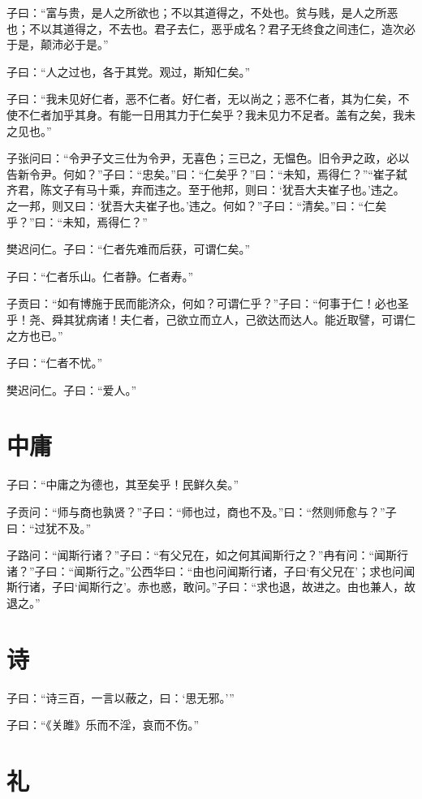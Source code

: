 \documentclass[a5paper]{ctexbook}
\begin{document}
    子曰：“富与贵，是人之所欲也；不以其道得之，不处也。贫与贱，是人之所恶也；不以其道得之，不去也。君子去仁，恶乎成名？君子无终食之间违仁，造次必于是，颠沛必于是。”

    子曰：“人之过也，各于其党。观过，斯知仁矣。”

    子曰：“我未见好仁者，恶不仁者。好仁者，无以尚之；恶不仁者，其为仁矣，不使不仁者加乎其身。有能一日用其力于仁矣乎？我未见力不足者。盖有之矣，我未之见也。”

    子张问曰：“令尹子文三仕为令尹，无喜色；三已之，无愠色。旧令尹之政，必以告新令尹。何如？”子曰：“忠矣。”曰：“仁矣乎？”曰：“未知，焉得仁？”“崔子弑齐君，陈文子有马十乘，弃而违之。至于他邦，则曰：‘犹吾大夫崔子也。’违之。之一邦，则又曰：‘犹吾大夫崔子也。’违之。何如？”子曰：“清矣。”曰：“仁矣乎？”曰：“未知，焉得仁？”

    樊迟问仁。子曰：“仁者先难而后获，可谓仁矣。”

    子曰：“仁者乐山。仁者静。仁者寿。”

    子贡曰：“如有博施于民而能济众，何如？可谓仁乎？”子曰：“何事于仁！必也圣乎！尧、舜其犹病诸！夫仁者，己欲立而立人，己欲达而达人。能近取譬，可谓仁之方也已。”

    子曰：“仁者不忧。”

    樊迟问仁。子曰：“爱人。”

    \chapter{中庸}

    子曰：“中庸之为德也，其至矣乎！民鲜久矣。”

    子贡问：“师与商也孰贤？”子曰：“师也过，商也不及。”曰：“然则师愈与？”子曰：“过犹不及。”

    子路问：“闻斯行诸？”子曰：“有父兄在，如之何其闻斯行之？”冉有问：“闻斯行诸？”子曰：“闻斯行之。”公西华曰：“由也问闻斯行诸，子曰‘有父兄在’；求也问闻斯行诸，子曰‘闻斯行之’。赤也惑，敢问。”子曰：“求也退，故进之。由也兼人，故退之。”

    \chapter{诗}

    子曰：“诗三百，一言以蔽之，曰：‘思无邪。’”

    子曰：“《关雎》乐而不淫，哀而不伤。”

    \chapter{礼}
\end{document}
